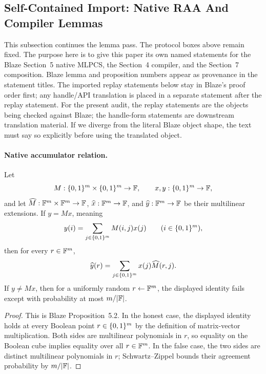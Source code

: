 \subsection{Self-Contained Import: Native RAA And Compiler Lemmas}

This subsection continues the lemma pass.  The protocol boxes above remain
fixed.  The purpose here is to give this paper its own named statements for the
Blaze Section~5 native MLPCS, the Section~4 compiler, and the Section~7
composition.  Blaze lemma and proposition numbers appear as provenance in the
statement titles.  The imported replay statements below stay in Blaze's proof
order first; any handle/API translation is placed in a separate statement after
the replay statement.  For the present audit, the replay statements are the
objects being checked against Blaze; the handle-form statements are downstream
translation material.  If we diverge from the literal Blaze object shape, the
text must say so explicitly before using the translated object.

\paragraph{Native accumulator relation.}

\begin{proposition}
\label{prop:blaze-matrix-vector-replay}
Let
\[
  M:\{0,1\}^m\times\{0,1\}^m\to\mathbb{F},
  \qquad
  x,y:\{0,1\}^m\to\mathbb{F},
\]
and let \(\widehat M:\mathbb{F}^m\times\mathbb{F}^m\to\mathbb{F}\),
\(\widehat x:\mathbb{F}^m\to\mathbb{F}\), and \(\widehat y:\mathbb{F}^m\to\mathbb{F}\) be their multilinear
extensions.  If \(y=Mx\), meaning
\[
  y(i)=\sum_{j\in\{0,1\}^m}M(i,j)x(j)
  \qquad(i\in\{0,1\}^m),
\]
then for every \(r\in\mathbb{F}^m\),
\[
  \widehat y(r)=
  \sum_{j\in\{0,1\}^m}x(j)\widehat M(r,j).
\]
If \(y\ne Mx\), then for a uniformly random \(r\leftarrow\mathbb{F}^m\), the displayed
identity fails except with probability at most \(m/|\mathbb{F}|\).
\end{proposition}

\begin{proof}
This is Blaze Proposition~5.2.  In the honest case, the displayed identity
holds at every Boolean point \(r\in\{0,1\}^m\) by the definition of matrix-vector
multiplication.  Both sides are multilinear polynomials in \(r\), so equality
on the Boolean cube implies equality over all \(r\in\mathbb{F}^m\).  In the false case,
the two sides are distinct multilinear polynomials in \(r\); Schwartz--Zippel
bounds their agreement probability by \(m/|\mathbb{F}|\).
\end{proof}

